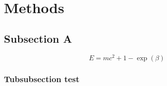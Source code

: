 \section{Methods}
\subsection{Subsection A}
\lipsum[1]
\begin{equation}
    E = mc^2 + 1 - \exp(\beta)
\end{equation}
\lipsum[2-3]
\subsubsection{Tubsubsection test}
\lipsum[30-40]